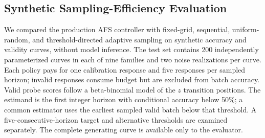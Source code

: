\documentclass{article}
\begin{document}
\begin{table}[!ht]
\centering
\caption{Share of valid probes reassigned relative to the primary taxonomy under alternative policies.}
\label{tab:taxonomy_policy_stability}
\scriptsize
{}
\end{table}


\subsection{Synthetic Sampling-Efficiency Evaluation}
\label{app:afs_simulation}
We compared the production AFS controller with fixed-grid, sequential, uniform-random, and threshold-directed adaptive sampling on synthetic accuracy and validity curves, without model inference. The test set contains 200 independently parameterized curves in each of nine families and two noise realizations per curve. Each policy pays for one calibration response and five responses per sampled horizon; invalid responses consume budget but are excluded from batch accuracy. Valid probe scores follow a beta-binomial model of the $z$ transition positions. The estimand is the first integer horizon with conditional accuracy below 50\%; a common estimator uses the earliest sampled valid batch below that threshold. A five-consecutive-horizon target and alternative thresholds are examined separately. The complete generating curve is available only to the evaluator.
\end{document}
